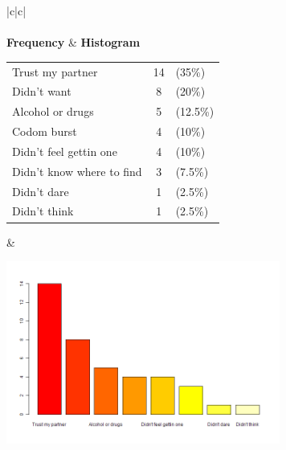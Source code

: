  
 	\begin{center}
	\addtolength{\leftskip}{-4cm}\addtolength{\rightskip}{-4cm}

\begin{tabular}{|c|c|}
\hline
{}\\

\\
\hline
 \textbf{Frequency} & \textbf{Histogram} \\

 \begin{tabular}{@{}l@{ : }cl@{}}

  Trust my partner & 14 & (35\%) \\

  Didn't want & 8 & (20\%) \\

  Alcohol or drugs & 5 & (12.5\%) \\

  Codom burst & 4 & (10\%) \\

  Didn't feel gettin one & 4 & (10\%) \\

  Didn't know where to find & 3 & (7.5\%) \\

  Didn't dare & 1 & (2.5\%) \\

  Didn't think & 1 & (2.5\%) \\

 \end{tabular}
 & \parbox{9cm}{\includegraphics[width=9cm]{graphUniv2/V-barplot.png}}
 \\
\hline
\end{tabular}
\end{center} 
